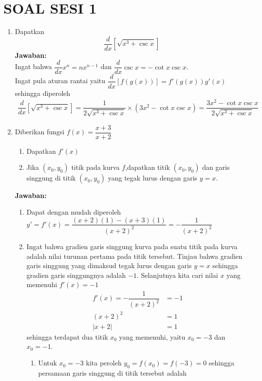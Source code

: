 \documentclass{article}
\begin{document}
\section*{SOAL SESI 1}
\begin{enumerate}
 
	\item Dapatkan 
	$$ \dfrac{d}{dx} \left[\sqrt{x^3+\csc x}\right] $$
	\textbf{Jawaban:}\\
	Ingat bahwa $\dfrac{d}{dx} x^n = nx^{n-1}$ dan $\dfrac{d}{dx} \csc x = -\cot x\csc x$. \\
	Ingat pula aturan rantai yaitu $\dfrac{d}{dx} [f(g(x))]=f'(g(x)) g'(x)$ sehingga diperoleh 
 	\begin{align*}
 	\dfrac{d}{dx} \left[\sqrt{x^3+\csc x}\right] = \dfrac{1}{2\sqrt{x^3+\csc x}}\times\left(3x^2-\cot x\csc x\right) = \dfrac{3x^2-\cot x\csc x}{2\sqrt{x^3+\csc x}}
 	\end{align*}
	\item Diberikan fungsi $f(x)=\dfrac{x+3}{x+2}$
	\begin{enumerate}
		\item Dapatkan $f'(x)$
		\item Jika $(x_0,y_0)$ titik pada kurva $f$,dapatkan titik $(x_0,y_0)$ dan garis singgung di titik $(x_0,y_0)$ yang tegak lurus dengan garis $y=x$.
	\end{enumerate}
	\textbf{Jawaban:}
	\begin{enumerate}
		\item Dapat dengan mudah diperoleh $y'=f'(x)=\dfrac{(x+2)(1)-(x+3)(1)}{(x+2)^2} = -\dfrac{1}{(x+2)^2}$
		\item Ingat bahwa gradien garis singgung kurva pada suatu titik pada kurva adalah nilai turunan pertama pada titik tersebut. Tinjau bahwa gradien garis singgung yang dimaksud tegak lurus dengan garis $y=x$ sehingga gradien garis singgungnya adalah $-1$. Selanjutnya kita cari nilai $x$ yang memenuhi $f'(x)=-1$
		\begin{align*}
		f'(x) = -\dfrac{1}{(x+2)^2} &= -1 \\
		(x+2)^2 &=1\\
		|x+2| &= 1 
		\end{align*}
		sehingga terdapat dua titik $x_0$ yang memenuhi, yaitu $x_0=-3$ dan $x_0=-1$. 
		\begin{enumerate}
			\item Untuk $x_0=-3$ kita peroleh $y_0=f(x_0)=f(-3)=0$ sehingga persamaan garis singgung di titik tersebut adalah 
			\begin{align*}

\end{align*}
\end{enumerate}
\end{enumerate}
\end{enumerate}
\end{document}

